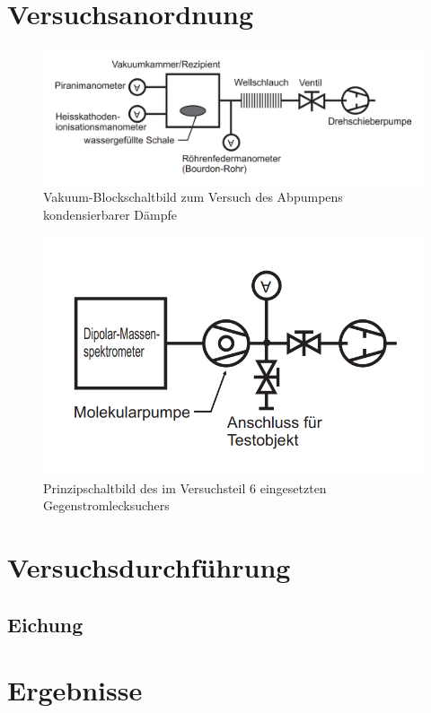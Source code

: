 \documentclass[12pt, a4paper]{scrartcl}
\begin{document}
	\section{Versuchsanordnung}
		\begin{figure}[h]
			\centering
			\includegraphics[width=.5\paperwidth]{aufbau22}
			\caption{Vakuum-Blockschaltbild zum Versuch des Abpumpens kondensierbarer Dämpfe}
		\end{figure}
	
		\begin{figure}[bh]
			\centering
			\includegraphics[width=.3\paperwidth]{aufbau262}
			\caption{Prinzipschaltbild des im Versuchsteil 6 eingesetzten Gegenstromlecksuchers}
		\end{figure}
		
	
	\section{Versuchsdurchführung}
	
	
	\subsection{Eichung}
	
	
	\section{Ergebnisse}
	
\end{document}
